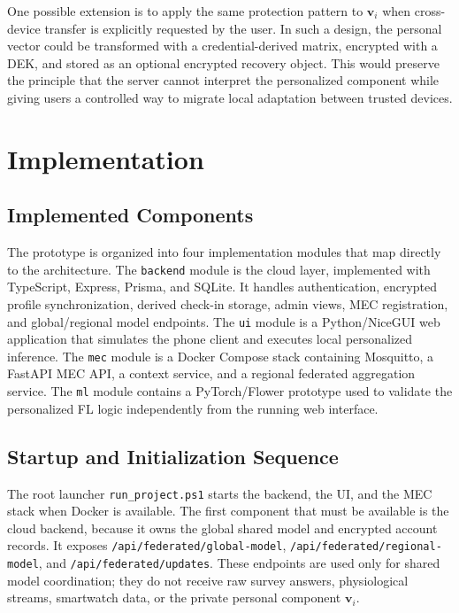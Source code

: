 \documentclass[lettersize,journal]{IEEEtran}
\begin{document}
One possible extension is to apply the same protection pattern to
$\mathbf{v}_i$ when cross-device transfer is explicitly requested by the
user. In such a design, the personal vector could be transformed with a
credential-derived matrix, encrypted with a DEK, and stored as an
optional encrypted recovery object. This would preserve the principle
that the server cannot interpret the personalized component while giving
users a controlled way to migrate local adaptation between trusted
devices.


\section{Implementation}

\subsection{Implemented Components}

The prototype is organized into four implementation modules that map
directly to the architecture. The \texttt{backend} module is the cloud
layer, implemented with TypeScript, Express, Prisma, and SQLite. It
handles authentication, encrypted profile synchronization, derived
check-in storage, admin views, MEC registration, and global/regional
model endpoints. The \texttt{ui} module is a Python/NiceGUI web
application that simulates the phone client and executes local
personalized inference. The \texttt{mec} module is a Docker Compose
stack containing Mosquitto, a FastAPI MEC API, a context service, and a
regional federated aggregation service. The \texttt{ml} module contains
a PyTorch/Flower prototype used to validate the personalized FL logic
independently from the running web interface.

\subsection{Startup and Initialization Sequence}

The root launcher \texttt{run\_project.ps1} starts the backend, the UI,
and the MEC stack when Docker is available. The first component that
must be available is the cloud backend, because it owns the global
shared model and encrypted account records. It exposes
\texttt{/api/federated/global-model},
\texttt{/api/federated/regional-model}, and
\texttt{/api/federated/updates}. These endpoints are used only for
shared model coordination; they do not receive raw survey answers,
physiological streams, smartwatch data, or the private personal
component $\mathbf{v}_i$.
\end{document}
